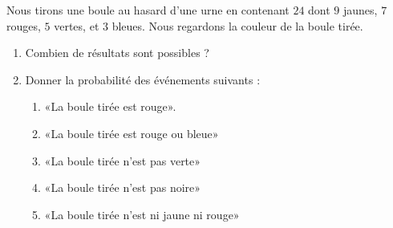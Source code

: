 
\begin{exercice}\label{exosmath-0189}

    Nous tirons une boule au hasard d'une urne en contenant \( 24\) dont \( 9\)  jaunes, \( 7\) rouges, \( 5\) vertes, et \( 3\) bleues. Nous regardons la couleur de la boule tirée.
    \begin{enumerate}
        \item
            Combien de résultats sont possibles ?
        \item
            Donner la probabilité des événements suivants :
            \begin{enumerate}
                \item
                    «La boule tirée est rouge».
                \item
                    «La boule tirée est rouge ou bleue» 
                \item
                    «La boule tirée n'est pas verte» 
                \item
                    «La boule tirée n'est pas noire» 
                \item
                    «La boule tirée n'est ni jaune ni rouge»
            \end{enumerate}
    \end{enumerate}

\end{exercice}
